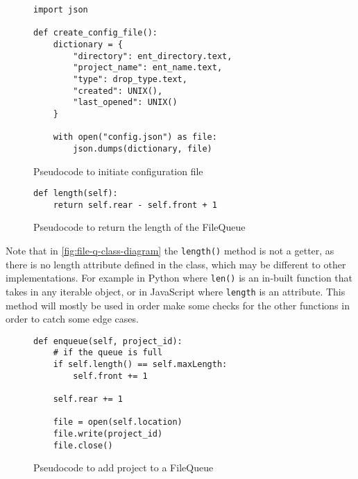         \begin{figure}[!ht]
            \begin{verbatim}
import json

def create_config_file():
    dictionary = {
        "directory": ent_directory.text,
        "project_name": ent_name.text,
        "type": drop_type.text,
        "created": UNIX(),
        "last_opened": UNIX()
    }

    with open("config.json") as file:
        json.dumps(dictionary, file)
            \end{verbatim}
            \caption{Pseudocode to initiate configuration file}
            \label{pc:init_config_file_c2}
        \end{figure}




        \newpage

        \begin{figure}[!ht]
            \begin{verbatim}
def length(self):
    return self.rear - self.front + 1
            \end{verbatim}
            \caption{Pseudocode to return the length of the FileQueue}
            \label{pc:fileq-length-method}
        \end{figure}

        Note that in \autoref{fig:file-q-class-diagram} the \verb|length()| method is not a getter, as there is no length attribute defined in the class, which may be different to other implementations. 
        For example in Python where \verb|len()| is an in-built function that takes in any iterable object, or in JavaScript where \verb|length| is an attribute. 
        This method will mostly be used in order make some checks for the other functions in order to catch some edge cases. 

        \begin{figure}[!ht]
            \begin{verbatim}
def enqueue(self, project_id):
    # if the queue is full
    if self.length() == self.maxLength:
        self.front += 1

    self.rear += 1

    file = open(self.location)
    file.write(project_id)
    file.close()
            \end{verbatim}
            \caption{Pseudocode to add project to a FileQueue}
            \label{pc:enq-for-file-q}
        \end{figure}

